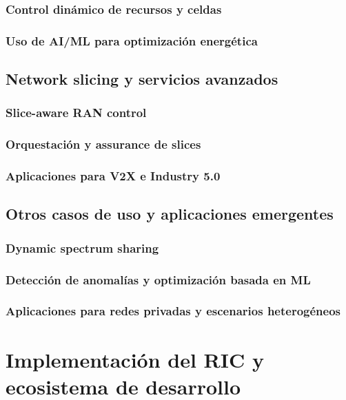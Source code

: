 \documentclass[11pt,a4paper]{article}
\makeatletter
\let\ORIGsection\section
\def\section{\@nobreakfalse\ORIGsection}
\let\ORIGsubsection\subsection
\def\subsection{\@nobreakfalse\ORIGsubsection}
\let\ORIGsubsubsection\subsubsection
\def\subsubsection{\@nobreakfalse\ORIGsubsubsection}
\makeatother
\begin{document}
\subsubsection{Control dinámico de recursos y celdas}
\subsubsection{Uso de AI/ML para optimización energética}

\subsection{Network slicing y servicios avanzados}

\subsubsection{Slice-aware RAN control}
\subsubsection{Orquestación y assurance de slices}
\subsubsection{Aplicaciones para V2X e Industry 5.0}

\subsection{Otros casos de uso y aplicaciones emergentes}

\subsubsection{Dynamic spectrum sharing}
\subsubsection{Detección de anomalías y optimización basada en ML}
\subsubsection{Aplicaciones para redes privadas y escenarios heterogéneos}


\section{Implementación del RIC y ecosistema de desarrollo}
\end{document}
